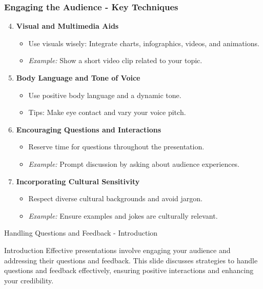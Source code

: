\documentclass[aspectratio=169]{beamer}
\begin{document}
\begin{frame}[fragile]
    \frametitle{Engaging the Audience - Key Techniques}
    \begin{enumerate}\setcounter{enumi}{3}
        \item \textbf{Visual and Multimedia Aids}
            \begin{itemize}
                \item Use visuals wisely: Integrate charts, infographics, videos, and animations.
                \item \textit{Example:} Show a short video clip related to your topic.
            \end{itemize}
        \item \textbf{Body Language and Tone of Voice}
            \begin{itemize}
                \item Use positive body language and a dynamic tone.
                \item Tips: Make eye contact and vary your voice pitch.
            \end{itemize}
        \item \textbf{Encouraging Questions and Interactions}
            \begin{itemize}
                \item Reserve time for questions throughout the presentation.
                \item \textit{Example:} Prompt discussion by asking about audience experiences.
            \end{itemize}
        \item \textbf{Incorporating Cultural Sensitivity}
            \begin{itemize}
                \item Respect diverse cultural backgrounds and avoid jargon.
                \item \textit{Example:} Ensure examples and jokes are culturally relevant.
            \end{itemize}
    \end{enumerate}
\end{frame}

\begin{frame}[fragile]{Handling Questions and Feedback - Introduction}
    \begin{block}{Introduction}
        Effective presentations involve engaging your audience and addressing their questions and feedback. 
        This slide discusses strategies to handle questions and feedback effectively, ensuring positive interactions and enhancing your credibility.
    \end{block}
\end{frame}
\end{document}

